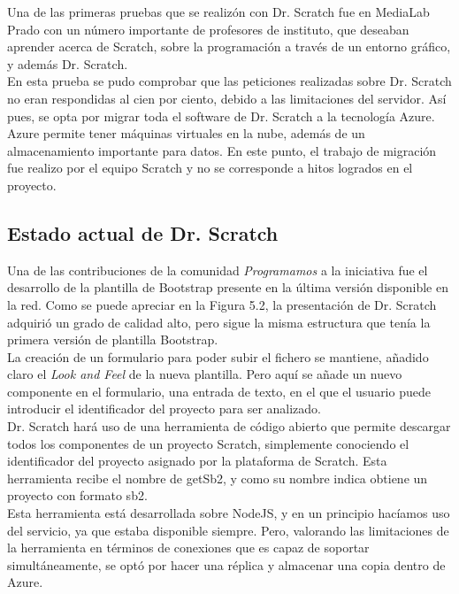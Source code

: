 \documentclass[a4paper, 12pt]{book}
\begin{document}
Una de las primeras pruebas que se realizón con Dr. Scratch fue en MediaLab Prado con
un número importante de profesores de instituto, que deseaban aprender acerca de 
Scratch, sobre la programación a través de un entorno gráfico, y además Dr. Scratch. \\

En esta prueba se pudo comprobar que las peticiones realizadas sobre Dr. Scratch no 
eran respondidas al cien por ciento, debido a las limitaciones del servidor. Así pues,
se opta por migrar toda el software de Dr. Scratch a la tecnología Azure. \\

Azure permite tener máquinas virtuales en la nube, además de un almacenamiento importante
para datos. En este punto, el trabajo de migración fue realizo por el equipo Scratch y no
se corresponde a hitos logrados en el proyecto.


\subsection{Estado actual de Dr. Scratch}


Una de las contribuciones de la comunidad \emph{Programamos} a la iniciativa fue el 
desarrollo de la plantilla de Bootstrap presente en la última versión disponible en
la red. Como se puede apreciar en la Figura 5.2, la presentación de Dr. Scratch
adquirió un grado de calidad alto, pero sigue la misma estructura que tenía la primera
versión de plantilla Bootstrap. \\

La creación de un formulario para poder subir el fichero se mantiene, añadido claro
el \emph{Look and Feel} de la nueva plantilla. Pero aquí se añade un nuevo componente
en el formulario, una entrada de texto, en el que el usuario puede introducir el 
identificador del proyecto para ser analizado. \\

Dr. Scratch hará uso de una herramienta de código abierto que permite descargar todos
los componentes de un proyecto Scratch, simplemente conociendo el identificador del
proyecto asignado por la plataforma de Scratch. Esta herramienta recibe el nombre de
getSb2, y como su nombre indica obtiene un proyecto con formato sb2. \\

Esta herramienta está desarrollada sobre NodeJS, y en un principio hacíamos uso del
servicio, ya que estaba disponible siempre. Pero, valorando las limitaciones
de la herramienta en términos de conexiones que es capaz de soportar simultáneamente, 
se optó por hacer una réplica y almacenar una copia dentro de Azure.
\end{document}

